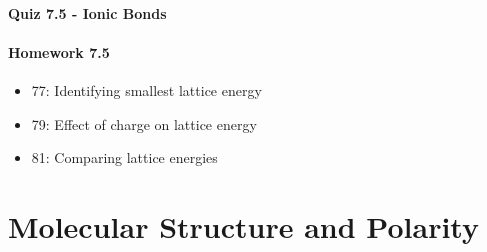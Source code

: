 \documentclass[12pt, openany, letterpaper]{memoir}
\begin{document}
\paragraph*{Quiz 7.5 - Ionic Bonds}
\paragraph*{Homework 7.5}
\begin{itemize}
  \item 77: Identifying smallest lattice energy
  \item 79: Effect of charge on lattice energy
  \item 81: Comparing lattice energies
\end{itemize}

\section{Molecular Structure and Polarity}
\end{document}
